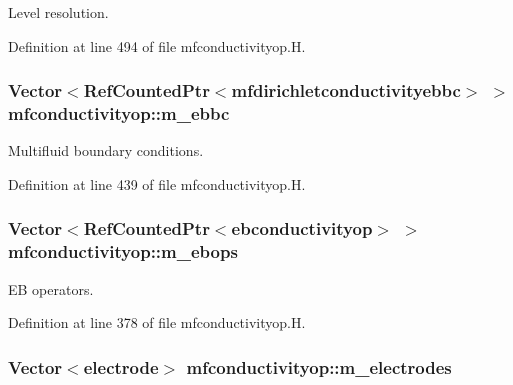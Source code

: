 Level resolution. 



Definition at line 494 of file mfconductivityop.\+H.

\subsubsection[{\texorpdfstring{m\+\_\+ebbc}{m_ebbc}}]{\setlength{\rightskip}{0pt plus 5cm}Vector$<$Ref\+Counted\+Ptr$<${\bf mfdirichletconductivityebbc}$>$ $>$ mfconductivityop\+::m\+\_\+ebbc\hspace{0.3cm}{\ttfamily [protected]}}\hypertarget{classmfconductivityop_aabaeff374933bb75d87b14cd89bf0932}{}\label{classmfconductivityop_aabaeff374933bb75d87b14cd89bf0932}


Multifluid boundary conditions. 



Definition at line 439 of file mfconductivityop.\+H.

\subsubsection[{\texorpdfstring{m\+\_\+ebops}{m_ebops}}]{\setlength{\rightskip}{0pt plus 5cm}Vector$<$Ref\+Counted\+Ptr$<${\bf ebconductivityop}$>$ $>$ mfconductivityop\+::m\+\_\+ebops\hspace{0.3cm}{\ttfamily [protected]}}\hypertarget{classmfconductivityop_af2c3b82031773d622031e032c961f554}{}\label{classmfconductivityop_af2c3b82031773d622031e032c961f554}


EB operators. 



Definition at line 378 of file mfconductivityop.\+H.

\subsubsection[{\texorpdfstring{m\+\_\+electrodes}{m_electrodes}}]{\setlength{\rightskip}{0pt plus 5cm}Vector$<${\bf electrode}$>$ mfconductivityop\+::m\+\_\+electrodes\hspace{0.3cm}{\ttfamily [protected]}}\hypertarget{classmfconductivityop_a23b9c25289b1c76ba0d453998cd242fa}{}\label{classmfconductivityop_a23b9c25289b1c76ba0d453998cd242fa}


